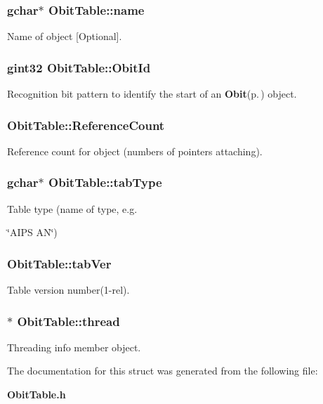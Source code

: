 \subsubsection{\setlength{\rightskip}{0pt plus 5cm}gchar$\ast$ {\bf Obit\-Table::name}}\label{structObitTable_o3}


Name of object [Optional]. 

\subsubsection{\setlength{\rightskip}{0pt plus 5cm}gint32 {\bf Obit\-Table::Obit\-Id}}\label{structObitTable_o0}


Recognition bit pattern to identify the start of an {\bf Obit}{\rm (p.\,\pageref{structObit})} object. 

\subsubsection{ {\bf Obit\-Table::Reference\-Count}}\label{structObitTable_o2}


Reference count for object (numbers of pointers attaching). 

\subsubsection{\setlength{\rightskip}{0pt plus 5cm}gchar$\ast$ {\bf Obit\-Table::tab\-Type}}\label{structObitTable_o12}


Table type (name of type, e.g. 

\char`\"{}AIPS AN\char`\"{}) 
\subsubsection{ {\bf Obit\-Table::tab\-Ver}}\label{structObitTable_o13}


Table version number(1-rel). 

\subsubsection{$\ast$ {\bf Obit\-Table::thread}}\label{structObitTable_o4}


Threading info member object. 



The documentation for this struct was generated from the following file:\begin{CompactItemize}
\item 
{\bf Obit\-Table.h}\end{CompactItemize}
